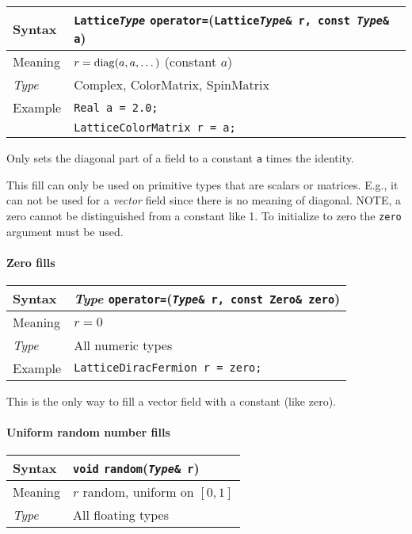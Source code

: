 \documentclass[12pt,letterpaper]{article}
\newcommand{\diag}{\mathop{\rm diag}}
\newcommand{\tLatticeColorMatrix}{LatticeColorMatrix}
\newcommand{\tLatticeDiracFermion}{LatticeDiracFermion}
\newcommand{\tReal}{Real}
\newcommand{\tComplex}{Complex}
\newcommand{\tColorMatrix}{ColorMatrix}
\newcommand{\tSpinMatrix}{SpinMatrix}
\newcommand{\allNumericTypes}{All numeric types}
\newcommand{\allFloatTypes}{All floating types}
\newcommand{\itt}{\it Type}
\begin{document}
\begin{flushleft}
  \begin{tabular}{|l|l|}
  \hline
  Syntax      & {\tt Lattice{\it Type}} \verb|operator=|({\tt Lattice{\it Type}\& r, const {\it Type}\& a})\\
  \hline
  Meaning     & $r = \diag(a,a,\ldots{})$ (constant $a$)\\
  \hline
  \itt        & \tComplex, \tColorMatrix, \tSpinMatrix \\
  \hline
  Example     & {\tt \tReal{} a = 2.0;}\\
              & {\tt \tLatticeColorMatrix{} r = a;}\\
  \hline
  \end{tabular}
\end{flushleft}

Only sets the diagonal part of a field to a constant \verb|a| times
the identity.

This fill can only be used on primitive types that are scalars or
matrices. E.g., it can not be used for a {\it vector} field since
there is no meaning of diagonal.  NOTE, a zero cannot be distinguished
from a constant like 1. To initialize to zero the \verb|zero| argument
must be used.

\paragraph{Zero fills}

\begin{flushleft}
  \begin{tabular}{|l|l|}
  \hline
  Syntax      & {\it Type} \verb|operator=|({\tt {\it Type}\& r, const Zero\& zero})\\
  \hline
  Meaning     & $r = 0$\\
  \hline
  \itt        & \allNumericTypes \\
  \hline
  Example     & {\tt \tLatticeDiracFermion{} r = zero;}\\
  \hline
  \end{tabular}
\end{flushleft}

This is the only way to fill a vector field with a constant (like zero).

\paragraph{Uniform random number fills}

\begin{flushleft}
  \begin{tabular}{|l|l|}
  \hline
  Syntax      & {\tt void} \verb|random|({\tt {\it Type}\& r}) \\
  \hline
  Meaning     & $r$ random, uniform on $[0,1]$ \\
  \hline
  \itt        & \allFloatTypes \\
  \hline
  \end{tabular}
\end{flushleft}
\end{document}

